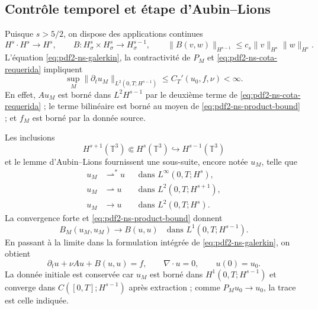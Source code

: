 \subsection{Contrôle temporel et étape d'Aubin--Lions}

Puisque $s>5/2$, on dispose des applications continues
\begin{equation}\label{eq:pdf2-ns-product-bound}
 H^s\cdot H^s\longrightarrow H^s,
 \qquad
 B:H^s_\sigma\times H^s_\sigma\longrightarrow H^{s-1}_\sigma,
 \qquad
 \|B(v,w)\|_{H^{s-1}}\le c_s\|v\|_{H^s}\|w\|_{H^s}.
\end{equation}
L'équation \eqref{eq:pdf2-ns-galerkin}, la contractivité de $P_M$ et
\eqref{eq:pdf2-ns-cota-requerida} impliquent
\begin{equation}\label{eq:pdf2-ns-time-bound}
 \sup_M\|\partial_tu_M\|_{L^2(0,T;H^{s-1})}
 \le C_T'(u_0,f,\nu)<\infty.
\end{equation}
En effet, $Au_M$ est borné dans $L^2H^{s-1}$ par le deuxième terme de
\eqref{eq:pdf2-ns-cota-requerida} ; le terme bilinéaire est borné au moyen de
\eqref{eq:pdf2-ns-product-bound} ; et $f_M$ est borné par la donnée source.

Les inclusions
\[
 H^{s+1}(\mathbb T^3)\Subset H^s(\mathbb T^3)
 \hookrightarrow H^{s-1}(\mathbb T^3)
\]
et le lemme d'Aubin--Lions fournissent une sous-suite, encore notée $u_M$,
telle que
\begin{equation}\label{eq:pdf2-ns-compactness}
 \begin{aligned}
 u_M&\rightharpoonup^*u&&\text{dans }L^\infty(0,T;H^s),\\
 u_M&\rightharpoonup u&&\text{dans }L^2(0,T;H^{s+1}),\\
 u_M&\longrightarrow u&&\text{dans }L^2(0,T;H^s).
 \end{aligned}
\end{equation}
La convergence forte et \eqref{eq:pdf2-ns-product-bound} donnent
\begin{equation}\label{eq:pdf2-ns-nonlinear-limit}
 B_M(u_M,u_M)\longrightarrow B(u,u)
 \quad\text{dans }L^1(0,T;H^{s-1}).
\end{equation}
En passant à la limite dans la formulation intégrée de
\eqref{eq:pdf2-ns-galerkin}, on obtient
\begin{equation}\label{eq:pdf2-ns-limit-equation}
 \partial_tu+\nu Au+B(u,u)=f,
 \qquad \nabla\!\cdot u=0,
 \qquad u(0)=u_0.
\end{equation}
La donnée initiale est conservée car
$u_M$ est borné dans $H^1(0,T;H^{s-1})$ et converge dans
$C([0,T];H^{s-1})$ après extraction ; comme $P_Mu_0\to u_0$, la trace est celle
indiquée.

